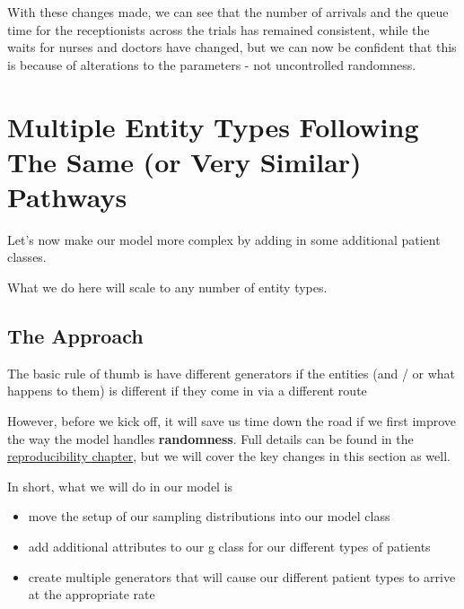 \documentclass[
  letterpaper,
  DIV=11,
  numbers=noendperiod]{scrreprt}
\providecommand{\tightlist}{%
  \setlength{\itemsep}{0pt}\setlength{\parskip}{0pt}}\usepackage{longtable,booktabs,array}
\begin{document}
With these changes made, we can see that the number of arrivals and the
queue time for the receptionists across the trials has remained
consistent, while the waits for nurses and doctors have changed, but we
can now be confident that this is because of alterations to the
parameters - not uncontrolled randomness.

\chapter{Multiple Entity Types Following The Same (or Very Similar)
Pathways}\label{multiple-entity-types-following-the-same-or-very-similar-pathways}

Let's now make our model more complex by adding in some additional
patient classes.

What we do here will scale to any number of entity types.

\section{The Approach}\label{the-approach-1}

\begin{tcolorbox}[enhanced jigsaw, colframe=quarto-callout-tip-color-frame, bottomtitle=1mm, breakable, rightrule=.15mm, coltitle=black, colbacktitle=quarto-callout-tip-color!10!white, opacityback=0, leftrule=.75mm, arc=.35mm, toptitle=1mm, title=\textcolor{quarto-callout-tip-color}{\faLightbulb}\hspace{0.5em}{Tip}, titlerule=0mm, colback=white, toprule=.15mm, bottomrule=.15mm, left=2mm, opacitybacktitle=0.6]

The basic rule of thumb is have different generators if the entities
(and / or what happens to them) is different if they come in via a
different route

\end{tcolorbox}

However, before we kick off, it will save us time down the road if we
first improve the way the model handles \textbf{randomness}. Full
details can be found in the \href{./reproducibility.qmd}{reproducibility
chapter}, but we will cover the key changes in this section as well.

In short, what we will do in our model is

\begin{itemize}
\tightlist
\item
  move the setup of our sampling distributions into our model class
\item
  add additional attributes to our g class for our different types of
  patients
\item
  create multiple generators that will cause our different patient types
  to arrive at the appropriate rate
\end{itemize}
\end{document}
